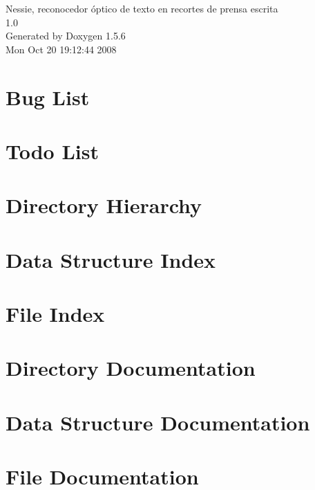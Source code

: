 \documentclass[a4paper]{book}
\begin{document}
\begin{titlepage}
\vspace*{7cm}
\begin{center}
{\Large Nessie, reconocedor óptico de texto en recortes de prensa escrita \\[1ex]\large 1.0 }\\
\vspace*{1cm}
{\large Generated by Doxygen 1.5.6}\\
\vspace*{0.5cm}
{\small Mon Oct 20 19:12:44 2008}\\
\end{center}
\end{titlepage}
\clearemptydoublepage
{}
\tableofcontents
\clearemptydoublepage
{}
\chapter{Bug List}
\label{bug}
\hypertarget{bug}{}

\chapter{Todo List}
\label{todo}
\hypertarget{todo}{}

\chapter{Directory Hierarchy}

\chapter{Data Structure Index}

\chapter{File Index}

\chapter{Directory Documentation}


\chapter{Data Structure Documentation}









\chapter{File Documentation}





















\printindex
\end{document}
